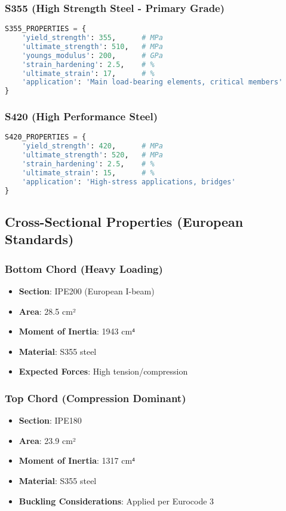 \documentclass[12pt,a4paper]{article}
\begin{document}
\subsubsection{S355 (High Strength Steel - Primary Grade)}

\begin{lstlisting}[language=Python, caption=S355 Steel Properties]
S355_PROPERTIES = {
    'yield_strength': 355,      # MPa
    'ultimate_strength': 510,   # MPa
    'youngs_modulus': 200,      # GPa
    'strain_hardening': 2.5,    # %
    'ultimate_strain': 17,      # %
    'application': 'Main load-bearing elements, critical members'
}
\end{lstlisting}

\subsubsection{S420 (High Performance Steel)}

\begin{lstlisting}[language=Python, caption=S420 Steel Properties]
S420_PROPERTIES = {
    'yield_strength': 420,      # MPa
    'ultimate_strength': 520,   # MPa
    'strain_hardening': 2.5,    # %
    'ultimate_strain': 15,      # %
    'application': 'High-stress applications, bridges'
}
\end{lstlisting}

\subsection{Cross-Sectional Properties (European Standards)}

\subsubsection{Bottom Chord (Heavy Loading)}
\begin{itemize}
    \item \textbf{Section}: IPE200 (European I-beam)
    \item \textbf{Area}: 28.5 cm²
    \item \textbf{Moment of Inertia}: 1943 cm⁴
    \item \textbf{Material}: S355 steel
    \item \textbf{Expected Forces}: High tension/compression
\end{itemize}

\subsubsection{Top Chord (Compression Dominant)}
\begin{itemize}
    \item \textbf{Section}: IPE180
    \item \textbf{Area}: 23.9 cm²
    \item \textbf{Moment of Inertia}: 1317 cm⁴
    \item \textbf{Material}: S355 steel
    \item \textbf{Buckling Considerations}: Applied per Eurocode 3
\end{itemize}
\end{document}
